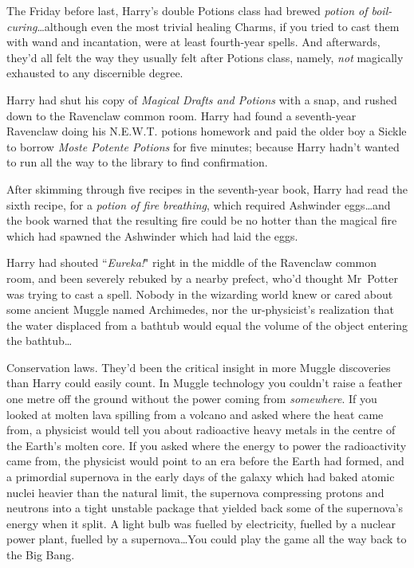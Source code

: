 The Friday before last, Harry's double Potions class had brewed \emph{potion of boil-curing}…although even the most trivial healing Charms, if you tried to cast them with wand and incantation, were at least fourth-year spells. And afterwards, they'd all felt the way they usually felt after Potions class, namely, \emph{not} magically exhausted to any discernible degree.

Harry had shut his copy of \emph{Magical Drafts and Potions} with a snap, and rushed down to the Ravenclaw common room. Harry had found a seventh-year Ravenclaw doing his N.E.W.T. potions homework and paid the older boy a Sickle to borrow \emph{Moste Potente Potions} for five minutes; because Harry hadn't wanted to run all the way to the library to find confirmation.

After skimming through five recipes in the seventh-year book, Harry had read the sixth recipe, for a \emph{potion of fire breathing}, which required Ashwinder eggs…and the book warned that the resulting fire could be no hotter than the magical fire which had spawned the Ashwinder which had laid the eggs.

Harry had shouted ``\emph{Eureka!}" right in the middle of the Ravenclaw common room, and been severely rebuked by a nearby prefect, who'd thought Mr~Potter was trying to cast a spell. Nobody in the wizarding world knew or cared about some ancient Muggle named Archimedes, nor the ur-physicist's realization that the water displaced from a bathtub would equal the volume of the object entering the bathtub…

Conservation laws. They'd been the critical insight in more Muggle discoveries than Harry could easily count. In Muggle technology you couldn't raise a feather one metre off the ground without the power coming from \emph{somewhere}. If you looked at molten lava spilling from a volcano and asked where the heat came from, a physicist would tell you about radioactive heavy metals in the centre of the Earth's molten core. If you asked where the energy to power the radioactivity came from, the physicist would point to an era before the Earth had formed, and a primordial supernova in the early days of the galaxy which had baked atomic nuclei heavier than the natural limit, the supernova compressing protons and neutrons into a tight unstable package that yielded back some of the supernova's energy when it split. A light bulb was fuelled by electricity, fuelled by a nuclear power plant, fuelled by a supernova…You could play the game all the way back to the Big Bang.

